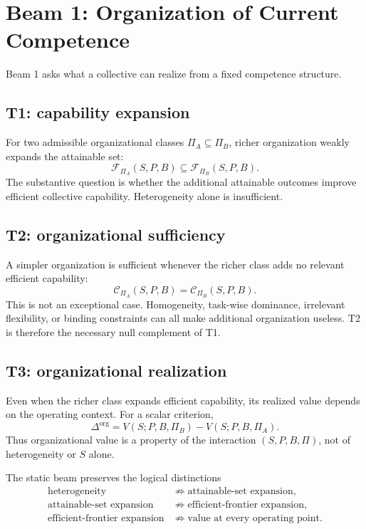 \documentclass[10pt]{article}
\newcommand{\Ccap}{\mathcal{C}}
\begin{document}
\section{Beam 1: Organization of Current Competence}

Beam 1 asks what a collective can realize from a fixed competence structure.

\subsection{T1: capability expansion}

For two admissible organizational classes $\Pi_A\subseteq\Pi_B$, richer organization weakly expands the attainable set:
\begin{equation}
\mathcal{F}_{\Pi_A}(S,P,B)\subseteq
\mathcal{F}_{\Pi_B}(S,P,B).
\end{equation}
The substantive question is whether the additional attainable outcomes improve efficient collective capability. Heterogeneity alone is insufficient.

\subsection{T2: organizational sufficiency}

A simpler organization is sufficient whenever the richer class adds no relevant efficient capability:
\begin{equation}
\Ccap_{\Pi_A}(S,P,B)=\Ccap_{\Pi_B}(S,P,B).
\end{equation}
This is not an exceptional case. Homogeneity, task-wise dominance, irrelevant flexibility, or binding constraints can all make additional organization useless. T2 is therefore the necessary null complement of T1.

\subsection{T3: organizational realization}

Even when the richer class expands efficient capability, its realized value depends on the operating context. For a scalar criterion,
\begin{equation}
\Delta^{\mathrm{org}}
=V(S;P,B,\Pi_B)-V(S;P,B,\Pi_A).
\end{equation}
Thus organizational value is a property of the interaction $(S,P,B,\Pi)$, not of heterogeneity or $S$ alone.

The static beam preserves the logical distinctions
\begin{equation}
\begin{split}
\text{heterogeneity} &\not\Rightarrow \text{attainable-set expansion},\\
\text{attainable-set expansion} &\not\Rightarrow \text{efficient-frontier expansion},\\
\text{efficient-frontier expansion} &\not\Rightarrow \text{value at every operating point}.
\end{split}
\end{equation}
\end{document}
